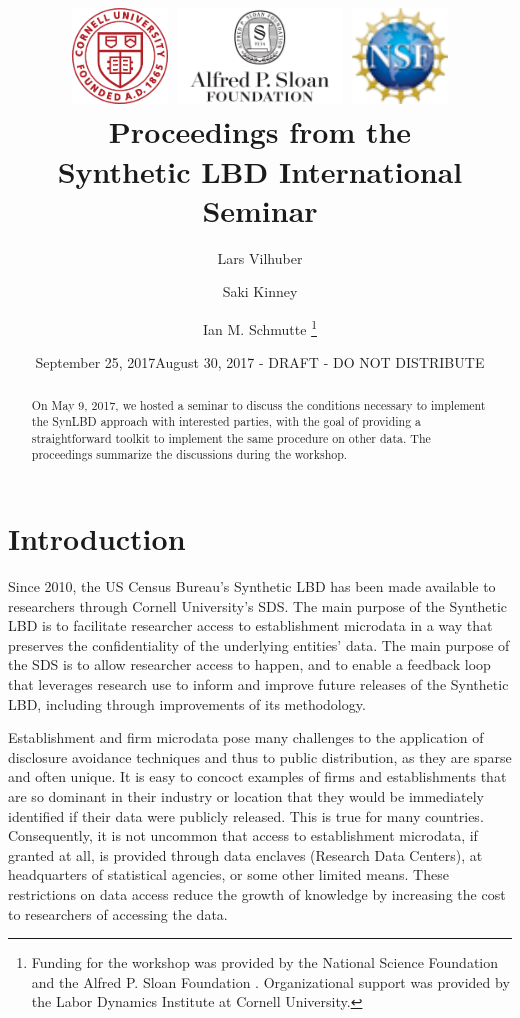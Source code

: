 \documentclass[letterpaper,12pt]{article}
\title{\includegraphics[height=1in]{cornell.png}
	\includegraphics[height=1in]{sloan.png}
	\includegraphics[height=1in]{nsf.png}
	\\
	Proceedings from the\\Synthetic LBD International Seminar}
\author{Lars Vilhuber \and Saki Kinney \and Ian M. Schmutte \thanks{Funding for the workshop was provided by the National Science Foundation \citepalias[Grants][]{nsf1012593,nsf1131848} and the Alfred P. Sloan Foundation \citepalias{sloan2015}. Organizational support was provided by the Labor Dynamics Institute at Cornell University. }}
\date{September 25, 2017}
\date{August 30, 2017 - DRAFT - DO NOT DISTRIBUTE}
\begin{document}

\maketitle

\begin{abstract}
On May 9, 2017, we hosted a seminar to discuss the conditions necessary to implement the SynLBD approach with interested parties, with the goal of providing  a straightforward toolkit to implement the same procedure on other data. The proceedings summarize the discussions during the workshop.
\end{abstract}

\newpage
\section{Introduction}
Since 2010, the US Census Bureau's Synthetic LBD \citep{KinneyEtAl2011} has been made available to researchers through Cornell University’s \ac{SDS}. The main purpose of the Synthetic LBD is to facilitate researcher access to establishment microdata in a way that preserves the confidentiality of the underlying entities' data. The main purpose of the \ac{SDS} is to allow  researcher access to happen, and to enable a feedback loop that leverages research use to inform and improve future releases of the Synthetic LBD, including through improvements of its methodology.

Establishment and firm microdata pose many challenges to the application of disclosure avoidance techniques and thus to public distribution, as they are sparse and often unique. It is easy to concoct examples of firms and establishments that are so dominant in their industry or location that they would be immediately identified if their data were publicly released. This is true for many countries. Consequently, it is not uncommon that access to establishment microdata, if granted at all, is provided through data enclaves (Research Data Centers), at headquarters of statistical agencies, or some other limited means. These restrictions on data access reduce the growth of knowledge by increasing the cost to researchers of accessing the data.
\end{document}
